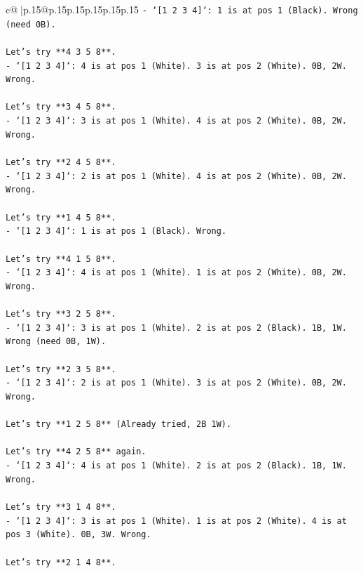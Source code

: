 \documentclass{article}
\begin{document}
{\begin{supertabular}{c@{$\;$}|p{.15\linewidth}@{}p{.15\linewidth}p{.15\linewidth}p{.15\linewidth}p{.15\linewidth}p{.15\linewidth}}
{{{\texttt{{-} `{[}1 2 3 4{]}`: 1 is at pos 1 (Black). Wrong (need 0B).} \\
\\ 
\texttt{Let's try **4 3 5 8**.} \\
\texttt{{-} `{[}1 2 3 4{]}`: 4 is at pos 1 (White). 3 is at pos 2 (White). 0B, 2W. Wrong.} \\
\\ 
\texttt{Let's try **3 4 5 8**.} \\
\texttt{{-} `{[}1 2 3 4{]}`: 3 is at pos 1 (White). 4 is at pos 2 (White). 0B, 2W. Wrong.} \\
\\ 
\texttt{Let's try **2 4 5 8**.} \\
\texttt{{-} `{[}1 2 3 4{]}`: 2 is at pos 1 (White). 4 is at pos 2 (White). 0B, 2W. Wrong.} \\
\\ 
\texttt{Let's try **1 4 5 8**.} \\
\texttt{{-} `{[}1 2 3 4{]}`: 1 is at pos 1 (Black). Wrong.} \\
\\ 
\texttt{Let's try **4 1 5 8**.} \\
\texttt{{-} `{[}1 2 3 4{]}`: 4 is at pos 1 (White). 1 is at pos 2 (White). 0B, 2W. Wrong.} \\
\\ 
\texttt{Let's try **3 2 5 8**.} \\
\texttt{{-} `{[}1 2 3 4{]}`: 3 is at pos 1 (White). 2 is at pos 2 (Black). 1B, 1W. Wrong (need 0B, 1W).} \\
\\ 
\texttt{Let's try **2 3 5 8**.} \\
\texttt{{-} `{[}1 2 3 4{]}`: 2 is at pos 1 (White). 3 is at pos 2 (White). 0B, 2W. Wrong.} \\
\\ 
\texttt{Let's try **1 2 5 8** (Already tried, 2B 1W).} \\
\\ 
\texttt{Let's try **4 2 5 8** again.} \\
\texttt{{-} `{[}1 2 3 4{]}`: 4 is at pos 1 (White). 2 is at pos 2 (Black). 1B, 1W. Wrong.} \\
\\ 
\texttt{Let's try **3 1 4 8**.} \\
\texttt{{-} `{[}1 2 3 4{]}`: 3 is at pos 1 (White). 1 is at pos 2 (White). 4 is at pos 3 (White). 0B, 3W. Wrong.} \\
\\ 
\texttt{Let's try **2 1 4 8**.} \\
}}}
\end{supertabular}}
\end{document}
